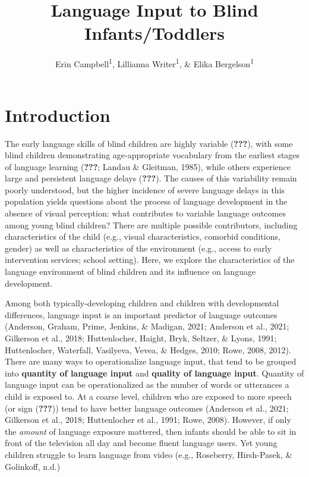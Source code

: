 \documentclass[english,man]{apa6}
\title{Language Input to Blind Infants/Toddlers}
\author{Erin Campbell\textsuperscript{1}, Lillianna Writer\textsuperscript{1}, \& Elika Bergelson\textsuperscript{1}}
\date{}
\affiliation{\vspace{0.5cm}\textsuperscript{1} Department of Psychology \& Neuroscience, Duke University, Durham, NC}
\begin{document}
\maketitle

\hypertarget{introduction}{%
\section{Introduction}\label{introduction}}

The early language skills of blind children are highly variable ({\textbf{???}}), with some blind children demonstrating age-appropriate vocabulary from the earliest stages of language learning ({\textbf{???}}; Landau \& Gleitman, 1985), while others experience large and persistent language delays ({\textbf{???}}). The causes of this variability remain poorly understood, but the higher incidence of severe language delays in this population yields questions about the process of language development in the absence of visual perception: what contributes to variable language outcomes among young blind children? There are multiple possible contributors, including characteristics of the child (e.g., visual characteristics, comorbid conditions, gender) as well as characteristics of the environment (e.g., access to early intervention services; school setting). Here, we explore the characteristics of the language environment of blind children and its influence on language development.

Among both typically-developing children and children with developmental differences, language input is an important predictor of language outcomes (Anderson, Graham, Prime, Jenkins, \& Madigan, 2021; Anderson et al., 2021; Gilkerson et al., 2018; Huttenlocher, Haight, Bryk, Seltzer, \& Lyons, 1991; Huttenlocher, Waterfall, Vasilyeva, Vevea, \& Hedges, 2010; Rowe, 2008, 2012). There are many ways to operationalize language input, that tend to be grouped into \textbf{quantity of language input} and \textbf{quality of language input}. Quantity of language input can be operationalized as the number of words or utterances a child is exposed to. At a coarse level, children who are exposed to more speech (or sign ({\textbf{???}})) tend to have better language outcomes (Anderson et al., 2021; Gilkerson et al., 2018; Huttenlocher et al., 1991; Rowe, 2008). However, if only the \emph{amount} of language exposure mattered, then infants should be able to sit in front of the television all day and become fluent language users. Yet young children struggle to learn language from video (e.g., Roseberry, Hirsh-Pasek, \& Golinkoff, n.d.)
\end{document}
